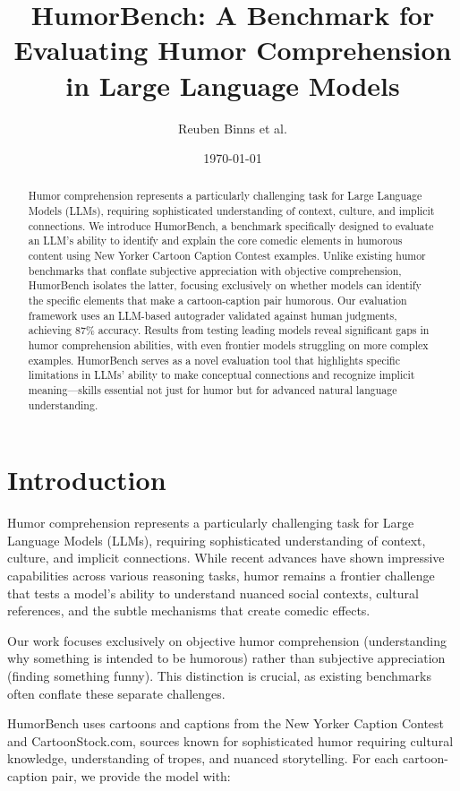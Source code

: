 \documentclass[twocolumn]{article}
\title{HumorBench: A Benchmark for Evaluating Humor Comprehension in Large Language Models}
\author{Reuben Binns et al.}
\date{\today}
\begin{document}
\maketitle

\begin{abstract}
Humor comprehension represents a particularly challenging task for Large Language Models (LLMs), requiring sophisticated understanding of context, culture, and implicit connections. We introduce HumorBench, a benchmark specifically designed to evaluate an LLM's ability to identify and explain the core comedic elements in humorous content using New Yorker Cartoon Caption Contest examples. Unlike existing humor benchmarks that conflate subjective appreciation with objective comprehension, HumorBench isolates the latter, focusing exclusively on whether models can identify the specific elements that make a cartoon-caption pair humorous. Our evaluation framework uses an LLM-based autograder validated against human judgments, achieving 87\% accuracy. Results from testing leading models reveal significant gaps in humor comprehension abilities, with even frontier models struggling on more complex examples. HumorBench serves as a novel evaluation tool that highlights specific limitations in LLMs' ability to make conceptual connections and recognize implicit meaning—skills essential not just for humor but for advanced natural language understanding.
\end{abstract}

\section{Introduction}

Humor comprehension represents a particularly challenging task for Large Language Models (LLMs), requiring sophisticated understanding of context, culture, and implicit connections. While recent advances have shown impressive capabilities across various reasoning tasks, humor remains a frontier challenge that tests a model's ability to understand nuanced social contexts, cultural references, and the subtle mechanisms that create comedic effects.

Our work focuses exclusively on objective humor comprehension (understanding why something is intended to be humorous) rather than subjective appreciation (finding something funny). This distinction is crucial, as existing benchmarks often conflate these separate challenges.

HumorBench uses cartoons and captions from the New Yorker Caption Contest and CartoonStock.com, sources known for sophisticated humor requiring cultural knowledge, understanding of tropes, and nuanced storytelling. For each cartoon-caption pair, we provide the model with:
\end{document}
